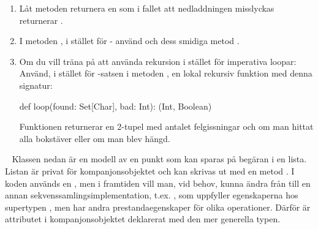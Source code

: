 \begin{enumerate}
\item Låt metoden  returnera en  som i fallet att nedladdningen misslyckas returnerar .

\item I metoden , i stället för - använd  och dess smidiga metod .

\item Om du vill träna på att använda rekursion i stället för imperativa loopar: Använd, i stället för -satsen i metoden , en lokal rekursiv funktion med denna signatur:
\begin{Code}
  def loop(found: Set[Char], bad: Int): (Int, Boolean)
\end{Code}
Funktionen  returnerar en 2-tupel med antalet felgissningar och  om man hittat alla bokstäver eller  om man blev hängd.

\end{enumerate}





\SOLUTION


\TaskSolved \what

\SubtaskSolved  {}

\SubtaskSolved  {}



\QUESTEND







\QUESTBEGIN

\Task  \what~
Klassen  nedan är en modell av en punkt som kan sparas på begäran i en lista. Listan är privat för kompanjonsobjektet och kan skrivas ut med en metod . I koden används en , men i framtiden vill man, vid behov, kunna ändra från  till en annan sekvenssamlingsimplementation, t.ex. , som uppfyller egenskaperna hos supertypen , men har andra prestandaegenskaper för olika operationer. Därför är attributet  i kompanjonsobjektet deklarerat med den mer generella typen.

